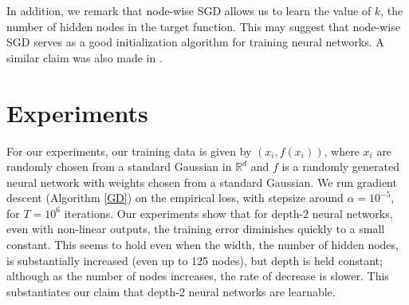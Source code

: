\documentclass{article}
\newcommand{\R}{{\mathbb{R}}}
\begin{document}
In addition, we remark that node-wise SGD allows us to learn the value of $k$, the number of hidden nodes in the target function. This may suggest that node-wise SGD serves as a good initialization algorithm for training neural networks. A similar claim was also made in \cite{WuM16}. 

 
\section{Experiments}
\label{experiments}
For our experiments, our training data is given by $(x_i, f(x_i))$, where $x_i$ are randomly chosen from a standard Gaussian in $\R^d$ and $f$ is a randomly generated neural network with weights chosen from a standard Gaussian. We run gradient descent (Algorithm \ref{GD}) on the empirical loss, with stepsize around $\alpha = 10^{-5}$, for $T = 10^6$ iterations. Our experiments show that for depth-2 neural networks, even with non-linear outputs, the training error diminishes quickly to a small constant. This seems to hold even when the width, the number of hidden nodes, is substantially increased (even up to 125 nodes), but depth is held constant; although as the number of nodes increases, the rate of decrease is slower. This substantiates our claim that depth-2 neural networks are learnable.
\end{document}
